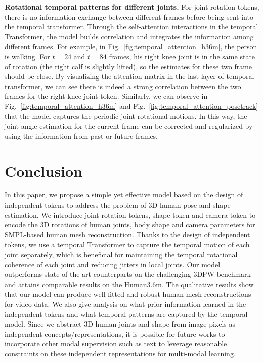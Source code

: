 {\bf Rotational temporal patterns for different joints.} For joint rotation tokens, there is no information exchange between different frames before being sent into the temporal transformer.
Through the self-attention interactions in the temporal Transformer, the model builds correlation and integrates the information among different frames. For example, in Fig.~\ref{fig:temporal_attention_h36m}, the person is walking. For $t=24$ and $t=84$ frames, his right knee joint is in the same state of rotation (the right calf is slightly lifted), so the estimates for these two frame should be close. 
By visualizing the attention matrix in the last layer of temporal transformer, we can see there is indeed a strong correlation between the two frames for the right knee joint token.
Similarly, we can observe in Fig.~\ref{fig:temporal_attention_h36m} and Fig.~\ref{fig:temporal_attention_posetrack} that the model captures the periodic joint rotational motions.  In this way, the joint angle estimation for the current frame can be corrected and regularized by using the information from past or future frames.

\section{Conclusion}
\label{discussion}
In this paper, we propose a simple yet effective model based on the design of independent tokens to address the problem of 3D human pose and shape estimation. We introduce joint rotation tokens, shape token and camera token to encode the 3D rotations of human joints, body shape and camera parameters for SMPL-based human mesh reconstruction. 
Thanks to the design of independent tokens, we use a temporal Transformer to capture the temporal motion of each joint separately, which is beneficial for maintaining the temporal rotational coherence of each joint and reducing jitters in local joints.
Our model outperforms state-of-the-art counterparts on the challenging 3DPW benchmark and attains comparable results on the Human3.6m.
The qualitative results show that our model can produce well-fitted and robust human mesh reconstructions for video data.
We also give analysis on what prior information learned in the independent tokens and what temporal patterns are captured by the temporal model.
Since we abstract 3D human joints and shape from image pixels as independent concepts/representations, it is possible for future works to incorporate other modal supervision such as text to leverage reasonable constraints on these independent representations for multi-modal learning.

